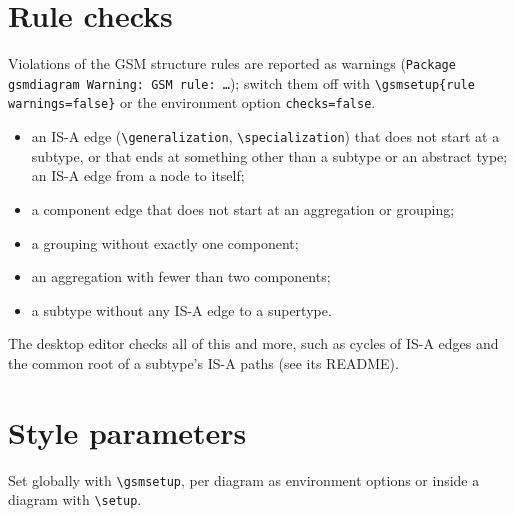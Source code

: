 \documentclass[10pt,a4paper]{article}
\newcommand\cs[1]{\texttt{\textbackslash#1}}
\begin{document}
\section{Rule checks}\label{sec:rules}

Violations of the GSM structure rules are reported as warnings
(\texttt{Package gsmdiagram Warning: GSM rule: \dots}); switch them off
with \verb|\gsmsetup{rule warnings=false}| or the environment option
\texttt{checks=false}.

\begin{itemize}
\item an IS-A edge (\cs{generalization}, \cs{specialization}) that does
  not start at a subtype, or that ends at something other than a subtype
  or an abstract type; an IS-A edge from a node to itself;
\item a component edge that does not start at an aggregation or grouping;
\item a grouping without exactly one component;
\item an aggregation with fewer than two components;
\item a subtype without any IS-A edge to a supertype.
\end{itemize}

The desktop editor checks all of this and more, such as cycles of IS-A edges and the common
root of a subtype's IS-A paths (see its README).

\section{Style parameters}

Set globally with \cs{gsmsetup}, per diagram as environment options or
inside a diagram with \cs{setup}.
\end{document}
